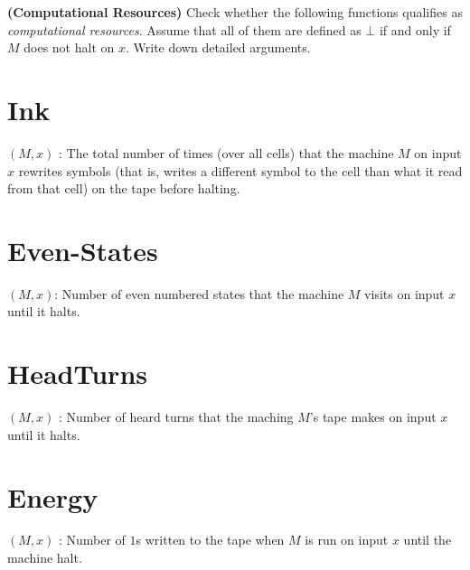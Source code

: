 \documentclass[solution,addpoints,12pt]{exam}
\newcommand{\Ink}{{\sc Ink}}
\begin{document}
\begin{questions}
\question[16]\textbf{(Computational Resources)}
Check whether the following functions qualifies as {\em computational resources}. Assume that all of them are defined as $\bot$ if and only if $M$ does not halt on $x$. Write down detailed arguments.
\begin{parts}
\part {\sc Ink}$(M,x)$ : The total number of times (over all cells) that the machine $M$ on input $x$ rewrites symbols (that is, writes a different symbol to the cell than what it read from that cell) on the tape before halting.
\part {\sc Even-States}$(M,x)$: Number of even numbered states that the machine $M$ visits on input $x$ until it halts.
\part {\sc HeadTurns}$(M,x)$ : Number of heard turns that the maching $M$'s tape makes on input $x$ until it halts.
\part {\sc Energy}$(M,x)$ : Number of $1$s written to the tape when $M$ is run on input $x$ until the machine halt.
\end{parts}
\begin{solution}
\end{solution}
\end{questions}
\end{document}
